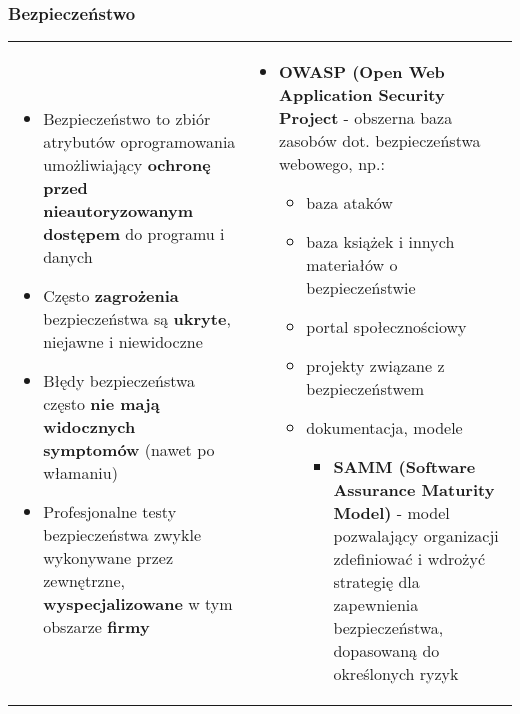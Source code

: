 \documentclass[../main.tex]{subfiles}
\begin{document}
    \subsubsection{Bezpieczeństwo}
    \begin{table}[H]
        \begin{center}
            \begin{tabular}{p{8cm} p{8cm}}
                \begin{itemize}
                    \item Bezpieczeństwo to zbiór atrybutów oprogramowania umożliwiający \textbf{ochronę przed nieautoryzowanym
                    dostępem} do programu i danych
                    \item Często \textbf{zagrożenia} bezpieczeństwa są \textbf{ukryte}, niejawne i niewidoczne
                    \item Błędy bezpieczeństwa często \textbf{nie mają widocznych symptomów} (nawet po włamaniu)
                    \item Profesjonalne testy bezpieczeństwa zwykle wykonywane przez zewnętrzne, \textbf{wyspecjalizowane} w tym obszarze \textbf{firmy}
                \end{itemize}
                &
                \begin{itemize}
                    \item \textbf{OWASP (Open Web Application Security Project} - obszerna baza zasobów dot. bezpieczeństwa webowego, np.:
                    \begin{itemize}
                        \item baza ataków
                        \item baza książek i innych materiałów o bezpieczeństwie
                        \item portal społecznościowy
                        \item projekty związane z bezpieczeństwem
                        \item dokumentacja, modele
                        \begin{itemize}
                            \item \textbf{SAMM (Software Assurance Maturity Model)} - model pozwalający organizacji zdefiniować i wdrożyć strategię dla zapewnienia bezpieczeństwa,
                            dopasowaną do określonych ryzyk
                        \end{itemize}
                    \end{itemize}
                \end{itemize}
            \end{tabular}
        \end{center}
    \end{table}
\end{document}
